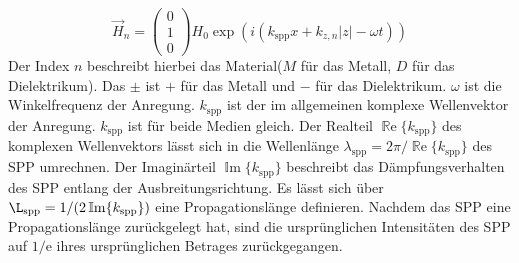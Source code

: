 \documentclass{article}
\begin{document}
	\begin{equation}
		\label{eq:magnetic_field_spp}
		\vec{H}_n = \begin{pmatrix} 0 \\ 1 \\ 0 \end{pmatrix} H_0 \exp\left(i(k_{\mathrm{spp}}x + k_{z, n}|z|-\omega t)\right)
	\end{equation}
	Der Index $n$ beschreibt hierbei das Material($M$ für das Metall, $D$ für das Dielektrikum). Das $\pm$ ist $+$ für das Metall und  $-$ für das Dielektrikum. $\omega$ ist die Winkelfrequenz der Anregung. $k_{\mathrm{spp}}$ ist der im allgemeinen komplexe Wellenvektor der Anregung.  $k_{\mathrm{spp}}$ ist für beide Medien gleich. Der Realteil $\operatorname{\mathbb{R}e}\{k_{\mathrm{spp}}\}$ des komplexen Wellenvektors lässt sich in die Wellenlänge $\lambda_{\mathrm{spp}} = 2\pi/ \operatorname{\mathbb{R}e}\{k_{\mathrm{spp}}\} $ des SPP umrechnen. Der Imaginärteil $\operatorname{\mathbb{I}m}\{k_{\mathrm{spp}}\}$ beschreibt das Dämpfungsverhalten des SPP entlang der Ausbreitungsrichtung. Es lässt sich über $\L_{\mathrm{spp}} = 1/(2\operatorname{\mathbb{I}m}\{k_{\mathrm{spp}}\})$ eine Propagationslänge definieren. Nachdem das SPP eine Propagationslänge zurückgelegt hat, sind die ursprünglichen Intensitäten des SPP auf $1/\mathrm{e}$ ihres ursprünglichen Betrages zurückgegangen.
	
\end{document}
